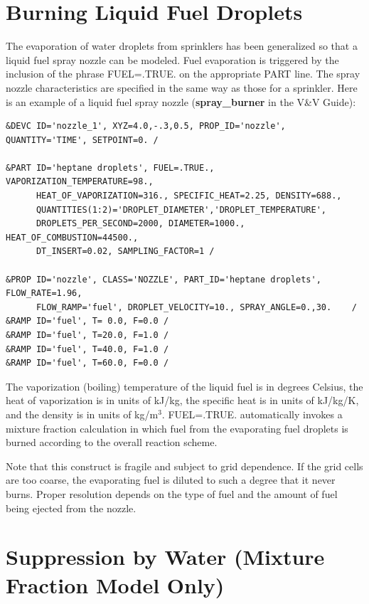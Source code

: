 \documentclass[11pt]{book}
\begin{document}
\section{Burning Liquid Fuel Droplets}

The evaporation of water droplets from sprinklers has been
generalized so that a liquid fuel spray
nozzle can be modeled. Fuel evaporation is triggered by the inclusion of the
phrase {\ct FUEL=.TRUE.} on the appropriate {\ct PART} line.
The spray nozzle characteristics are specified
in the same way as those for a sprinkler. Here is an example of a liquid fuel spray nozzle ({\bf spray\_burner} in the V\&V Guide):

\footnotesize
\begin{verbatim}
&DEVC ID='nozzle_1', XYZ=4.0,-.3,0.5, PROP_ID='nozzle', QUANTITY='TIME', SETPOINT=0. /

&PART ID='heptane droplets', FUEL=.TRUE., VAPORIZATION_TEMPERATURE=98.,
      HEAT_OF_VAPORIZATION=316., SPECIFIC_HEAT=2.25, DENSITY=688.,
      QUANTITIES(1:2)='DROPLET_DIAMETER','DROPLET_TEMPERATURE',
      DROPLETS_PER_SECOND=2000, DIAMETER=1000., HEAT_OF_COMBUSTION=44500.,
      DT_INSERT=0.02, SAMPLING_FACTOR=1 /

&PROP ID='nozzle', CLASS='NOZZLE', PART_ID='heptane droplets', FLOW_RATE=1.96,
      FLOW_RAMP='fuel', DROPLET_VELOCITY=10., SPRAY_ANGLE=0.,30.    /
&RAMP ID='fuel', T= 0.0, F=0.0 /
&RAMP ID='fuel', T=20.0, F=1.0 /
&RAMP ID='fuel', T=40.0, F=1.0 /
&RAMP ID='fuel', T=60.0, F=0.0 /
\end{verbatim}
\normalsize

\noindent
The vaporization (boiling) temperature of
the liquid fuel is in degrees Celsius, the heat of vaporization
is in units of kJ/kg, the specific heat is in units of
kJ/kg/K, and the density is in units of kg/m$^3$.
{\ct FUEL=.TRUE.} automatically
invokes a mixture fraction calculation in which fuel
from the evaporating fuel droplets is burned according to the overall reaction scheme.

Note
that this construct is fragile and subject to grid
dependence. If the grid cells are too coarse, the
evaporating fuel is diluted to such a degree that it
never burns. Proper resolution depends on the type of
fuel and the amount of fuel being ejected from the
nozzle.



\section{Suppression by Water (Mixture Fraction Model Only)}
\end{document}
